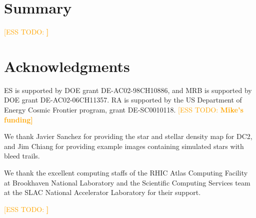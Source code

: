 \documentclass[twocolumn,twocolappendix,astrosym]{openjournal}
\newcommand{\esstodo}[1]{\textcolor{orange}{[ESS TODO: \bf #1]}}
\begin{document}
\section{Summary} \label{sec:summary}

\esstodo{}

\section*{Acknowledgments}

ES is supported by DOE grant DE-AC02-98CH10886, and MRB is supported by DOE
grant DE-AC02-06CH11357. RA is supported by the US Department of Energy Cosmic
Frontier program, grant DE-SC0010118.  \esstodo{Mike's funding}

We thank Javier Sanchez for providing the star and stellar density map for DC2,
and Jim Chiang for providing example images containing simulated stars
with bleed trails.

We thank the excellent computing staffs of the RHIC Atlas Computing Facility at
Brookhaven National Laboratory and the Scientific Computing Services team at
the SLAC National Accelerator Laboratory for their support.

\esstodo{}


%
%
%
%


\end{document}

